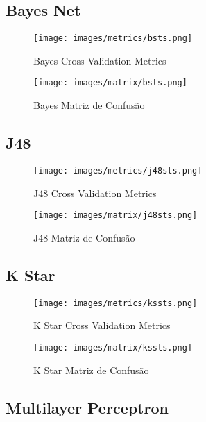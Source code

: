 \subsection{Bayes Net}

\begin{figure}[H]
  \centering
  \texttt{[image: images/metrics/bsts.png]}
  \caption{Bayes Cross Validation Metrics}
  \label{fig:b_sts_metrics}
\end{figure}

\begin{figure}[H]
  \centering
  \texttt{[image: images/matrix/bsts.png]}
  \caption{Bayes Matriz de Confusão}
  \label{fig:b_sts_matrix}
\end{figure}

\subsection{J48}

\begin{figure}[H]
  \centering
  \texttt{[image: images/metrics/j48sts.png]}
  \caption{J48 Cross Validation Metrics}
  \label{fig:j48_sts_metrics}
\end{figure}

\begin{figure}[H]
  \centering
  \texttt{[image: images/matrix/j48sts.png]}
  \caption{J48 Matriz de Confusão}
  \label{fig:j48_sts_matrix}
\end{figure}

\subsection{K Star}

\begin{figure}[H]
  \centering
  \texttt{[image: images/metrics/kssts.png]}
  \caption{K Star Cross Validation Metrics}
  \label{fig:ks_sts_metrics}
\end{figure}

\begin{figure}[H]
  \centering
  \texttt{[image: images/matrix/kssts.png]}
  \caption{K Star Matriz de Confusão}
  \label{fig:ks_sts_matrix}
\end{figure}


\subsection{Multilayer Perceptron}

